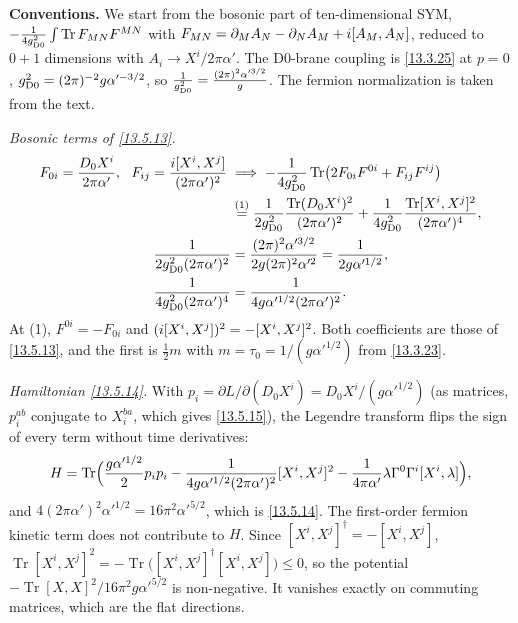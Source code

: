 \begin{tcolorbox}[breakable]
	\begin{remark}
		\textbf{Conventions.} We start from the bosonic part of ten-dimensional SYM, $-\frac{1}{4g_{\rm D0}^2}\int\operatorname{Tr}F_{MN}F^{MN}$ with $F_{MN}=\partial_MA_N-\partial_NA_M+i[A_M,A_N]$, reduced to $0+1$ dimensions with $A_i\to X^i/2\pi\alpha'$. The D0-brane coupling is \eqref{13.3.25} at $p=0$, $g_{\rm D0}^2=(2\pi)^{-2}g\alpha'^{-3/2}$, so $\frac1{g_{\rm D0}^2}=\frac{(2\pi)^2\alpha'^{3/2}}{g}$. The fermion normalization is taken from the text.

		\textit{Bosonic terms of \eqref{13.5.13}.}
		\begin{align*}
			F_{0i}=\frac{D_0X^i}{2\pi\alpha'},\ \ F_{ij}=\frac{\mi[X^i,X^j]}{(2\pi\alpha')^2}
			\;&\Longrightarrow\;
			-\frac1{4g_{\rm D0}^2}\operatorname{Tr}\bigl(2F_{0i}F^{0i}+F_{ij}F^{ij}\bigr)\\
			&\eqs{1} \frac{1}{2g_{\rm D0}^2}\frac{\operatorname{Tr}(D_0X^i)^2}{(2\pi\alpha')^2}+\frac{1}{4g_{\rm D0}^2}\frac{\operatorname{Tr}[X^i,X^j]^2}{(2\pi\alpha')^4},\\
			\frac{1}{2g_{\rm D0}^2(2\pi\alpha')^2} &= \frac{(2\pi)^2\alpha'^{3/2}}{2g(2\pi)^2\alpha'^2}=\frac{1}{2g\alpha'^{1/2}},\\
			\frac{1}{4g_{\rm D0}^2(2\pi\alpha')^4}&=\frac{1}{4g\alpha'^{1/2}(2\pi\alpha')^2} .
		\end{align*}
		At (1), $F^{0i}=-F_{0i}$ and $(i[X^i,X^j])^2=-[X^i,X^j]^2$. Both coefficients are those of \eqref{13.5.13}, and the first is $\frac12m$ with $m=\tau_0=1/(g\alpha'^{1/2})$ from \eqref{13.3.23}.

		\textit{Hamiltonian \eqref{13.5.14}.} With $p_i=\partial L/\partial(D_0X^i)=D_0X^i/(g\alpha'^{1/2})$ (as matrices, $p^{ab}_i$ conjugate to $X^{ba}_i$, which gives \eqref{13.5.15}), the Legendre transform flips the sign of every term without time derivatives:
		\begin{equation*}
			H=\operatorname{Tr}\Bigl(\frac{g\alpha'^{1/2}}{2}p_ip_i-\frac{1}{4g\alpha'^{1/2}(2\pi\alpha')^2}[X^i,X^j]^2-\frac1{4\pi\alpha'}\lambda\Gamma^0\Gamma^i[X^i,\lambda]\Bigr),
		\end{equation*}
		and $4(2\pi\alpha')^2\alpha'^{1/2}=16\pi^2\alpha'^{5/2}$, which is \eqref{13.5.14}. The first-order fermion kinetic term does not contribute to $H$. Since $[X^i,X^j]^\dagger=-[X^i,X^j]$, $\operatorname{Tr}[X^i,X^j]^2=-\operatorname{Tr}\bigl([X^i,X^j]^\dagger[X^i,X^j]\bigr)\le0$, so the potential $-\operatorname{Tr}[X,X]^2/16\pi^2g\alpha'^{5/2}$ is non-negative. It vanishes exactly on commuting matrices, which are the flat directions.


\end{remark}
\end{tcolorbox}
